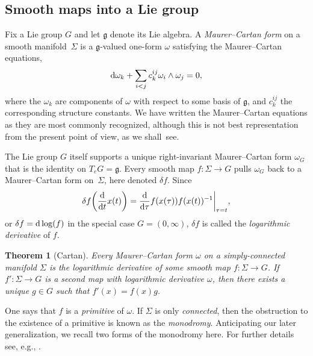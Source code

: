 \documentclass[10pt,a4paper]{amsart}
\numberwithin{equation}{section}
\newtheorem{Theorem}{Theorem}[section]
\begin{document}
\subsection*{Smooth maps into a Lie group}

Fix a Lie group $G$ and let ${\mathfrak g}$ denote its Lie algebra. A
{\it Maurer--Cartan form} on a smooth mani\-fold~$\Sigma $ is a
${\mathfrak g}$-valued one-form $\omega $ satisfying the Maurer--Cartan
equations,
\begin{equation*}
{\rm d} \omega_k + \sum_{i<j}c_k^{ij}\omega_i \wedge
\omega_j =0,
\end{equation*}
where the $\omega_k$ are components of $\omega$ with
respect to some basis of ${\mathfrak g} $, and $c_k^{ij}$ the
corresponding structure constants. We have written the Maurer--Cartan
equations as they are most commonly recognized, although this is not
best representation from the present point of view, as we shall~see.

The Lie group $G$ itself supports a unique right-invariant
Maurer--Cartan form $\omega_G$ that is the identity on
$T_e{G}={\mathfrak g} $. Every smooth map $f \colon \Sigma \rightarrow
G$ pulls $\omega_G$ back to a Maurer--Cartan form on~$\Sigma $, here
denoted $\delta f$. Since
\begin{equation*}
\delta f \bigg(\frac{\rm d}{{\rm d}t}x(t)\bigg)
=\frac{\rm d}{{\rm d}\tau}f(x(\tau))f(x(t))^{-1}\bigg|_{\tau=t},
\end{equation*}
or $\delta f = {\rm d}\log(f)$ in the special case
$G=(0,\infty)$, $\delta f$ is called the {\it logarithmic derivative}
of $f$.

\begin{Theorem}[Cartan]\label{tslT} Every Maurer--Cartan form $\omega$ on a
simply-connected manifold $\Sigma $ is the logarithmic derivative of
some smooth map $f \colon \Sigma \rightarrow G$. If $f' \colon \Sigma
\rightarrow G$ is a second map with logarithmic derivative $\omega $,
then there exists a unique $g \in G$ such that $f'(x)=f(x)g$.
\end{Theorem}

One says that $f$ is a {\it primitive} of $\omega $. If $\Sigma $ is
only {\itshape connected}, then the obstruction to the existence of a
primitive is known as the {\it monodromy}. Anticipating our later
generalization, we recall two forms of the monodromy here. For further
details see, e.g., \cite[Theorem~7.14, p.~124]{Sharpe_97}.
\end{document}
